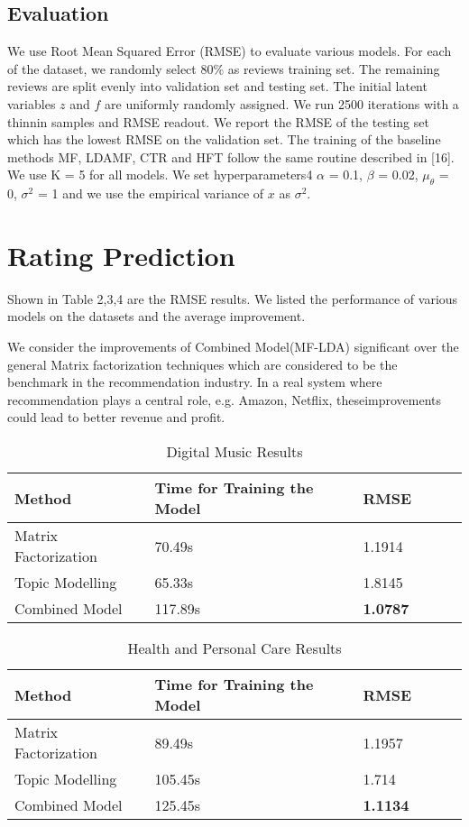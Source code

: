 \documentclass[10pt,conference]{IEEEtran}
\begin{document}
\subsection{Evaluation}
We use Root Mean Squared Error (RMSE) to evaluate various models.
For each of the dataset, we randomly select 80\% as reviews training set. The remaining reviews are split evenly into validation set and testing set. The initial latent variables $z$ and $f$ are uniformly randomly assigned. We run 2500 iterations with a thinnin samples and RMSE readout. We report the RMSE of the testing set which has the lowest RMSE on the validation set. The training of the baseline methods MF, LDAMF, CTR and HFT follow the same routine described in [16]. We use K = 5 for all models. We set hyperparameters4 $\alpha$ = 0.1, $\beta$ = 0.02, $\mu_\theta$ = 0, $\sigma^2$ = 1 and we use the empirical variance of $x$ as $\sigma^2$.

\section{Rating Prediction}

Shown in Table 2,3,4 are the RMSE results. We listed the performance of various models on the datasets and the average improvement.

We consider the improvements of Combined Model(MF-LDA) significant over the general Matrix factorization techniques which are considered to be the benchmark in the recommendation industry. In a real system where recommendation plays a central ro​le, e.g. Amazon, Netflix, these ​improvements could le​ad to better revenue and profit.

\begin{table}[h]
\centering
\caption{Digital Music Results}
\label{Digital Music Results}
\begin{tabular}{ llllll }
\toprule
\textbf{Method} & \textbf{Time for Training the Model} & \textbf{RMSE} \\
\midrule
Matrix Factorization & 70.49s & 1.1914 \\
\hline
Topic Modelling & 65.33s & 1.8145 \\
\hline
Combined Model & 117.89s  & \textbf{1.0787} \\ 
\bottomrule
\end{tabular}
\end{table}


\begin{table}[h]
\centering
\caption{Health and Personal Care Results}
\label{Health and Personal Care Results}
\begin{tabular}{ llllll }
\toprule
\textbf{Method} & \textbf{Time for Training the Model} & \textbf{RMSE} \\
\midrule
Matrix Factorization & 89.49s & 1.1957 \\
\hline
Topic Modelling & 105.45s & 1.714 \\
\hline
Combined Model & 125.45s  & \textbf{1.1134} \\ 
\bottomrule
\end{tabular}
\end{table}
\end{document}
